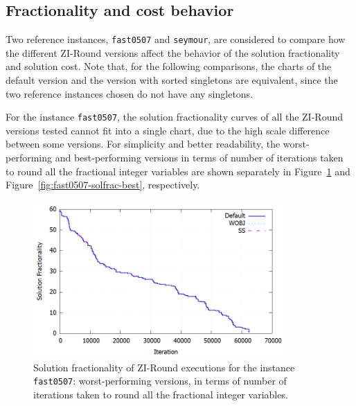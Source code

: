 \documentclass[a4paper,12pt]{book}
\begin{document}
\subsection{Fractionality and cost behavior}

Two reference instances, \texttt{fast0507} and \texttt{seymour}, are considered to compare how the different ZI-Round versions affect the behavior of the solution fractionality and solution cost. Note that, for the following comparisons, the charts of the default version and the version with sorted singletons are equivalent, since the two reference instances chosen do not have any singletons. \par

For the instance \texttt{fast0507}, the solution fractionality curves of all the ZI-Round versions tested cannot fit into a single chart, due to the high scale difference between some versions. For simplicity and better readability, the worst-performing and best-performing versions in terms of number of iterations taken to round all the fractional integer variables are shown separately in Figure~\ref{fig:fast0507-solfrac-worst} and Figure~\ref{fig:fast0507-solfrac-best}, respectively.

\begin{figure}[ht]
	\centering
	\includegraphics[width=0.85\textwidth]{fast0507-solfrac-worst.png}
	\caption{Solution fractionality of ZI-Round executions for the instance \texttt{fast0507}: worst-performing versions, in terms of number of iterations taken to round all the fractional integer variables.}
	\label{fig:fast0507-solfrac-worst}
\end{figure}
\end{document}
